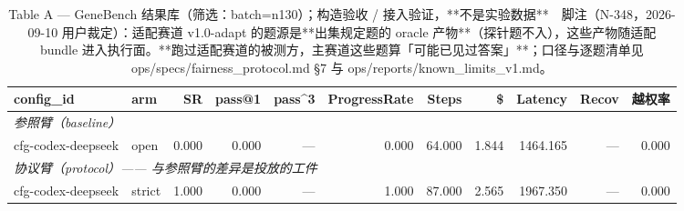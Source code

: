 \begin{table}[t]
\centering
\caption{Table A — GeneBench 结果库（筛选：batch=n130）；构造验收 / 接入验证，**不是实验数据**　脚注（N-348，2026-09-10 用户裁定）：适配赛道 v1.0-adapt 的题源是**出集规定题的 oracle 产物**（探针题不入），这些产物随适配 bundle 进入执行面。**跑过适配赛道的被测方，主赛道这些题算「可能已见过答案」**；口径与逐题清单见 ops/specs/fairness\_protocol.md §7 与 ops/reports/known\_limits\_v1.md。}
\label{tab:a-n130}
\begin{tabular}{llrrrrrrrrr}
\toprule
config\_id & arm & SR & pass@1 & pass\^{}3 & ProgressRate & Steps & \$ & Latency & Recov & 越权率 \\
\midrule
\multicolumn{11}{l}{\textit{参照臂（baseline）}} \\
cfg-codex-deepseek & open & 0.000 & 0.000 & --- & 0.000 & 64.000 & 1.844 & 1464.165 & --- & 0.000 \\
\midrule
\multicolumn{11}{l}{\textit{协议臂（protocol）—— 与参照臂的差异是投放的工件}} \\
cfg-codex-deepseek & strict & 1.000 & 0.000 & --- & 1.000 & 87.000 & 2.565 & 1967.350 & --- & 0.000 \\
\bottomrule
\end{tabular}
\end{table}

